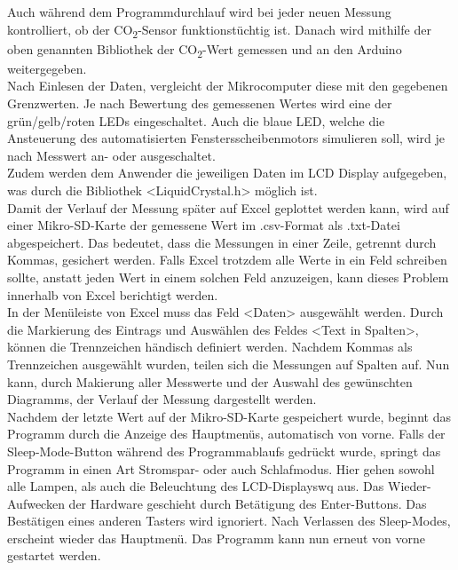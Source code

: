 Auch während dem Programmdurchlauf wird bei jeder neuen Messung kontrolliert, ob der CO\textsubscript{2}-Sensor funktionstüchtig ist. Danach wird mithilfe der oben genannten Bibliothek der CO\textsubscript{2}-Wert gemessen und an den Arduino weitergegeben. \\
Nach Einlesen der Daten, vergleicht der Mikrocomputer diese mit den gegebenen Grenzwerten. Je nach Bewertung des gemessenen Wertes wird eine der grün/gelb/roten \ac{LED}s eingeschaltet. Auch die blaue \ac{LED}, welche die Ansteuerung des automatisierten Fenstersscheibenmotors simulieren soll, wird je nach Messwert an- oder ausgeschaltet. \\
Zudem werden dem Anwender die jeweiligen Daten im \ac{LCD} Display aufgegeben, was durch die Bibliothek <LiquidCrystal.h> möglich ist. \\
Damit der Verlauf der Messung später auf Excel geplottet werden kann, wird auf einer Mikro-SD-Karte der gemessene Wert im .csv-Format als .txt-Datei abgespeichert. Das bedeutet, dass die Messungen in einer Zeile, getrennt durch Kommas, gesichert werden. Falls Excel trotzdem alle Werte in ein Feld schreiben sollte, anstatt jeden Wert in einem solchen Feld anzuzeigen, kann dieses Problem innerhalb von Excel berichtigt werden. \\
In der Menüleiste von Excel muss das Feld <Daten> ausgewählt werden. Durch die Markierung des Eintrags und Auswählen des Feldes <Text in Spalten>, können die Trennzeichen händisch definiert werden. Nachdem Kommas als Trennzeichen ausgewählt wurden, teilen sich die Messungen auf Spalten auf. Nun kann, durch Makierung aller Messwerte und der Auswahl des gewünschten Diagramms, der Verlauf der Messung dargestellt werden. \\
Nachdem der letzte Wert auf der Mikro-SD-Karte gespeichert wurde, beginnt das Programm durch die Anzeige des Hauptmenüs, automatisch von vorne. Falls der Sleep-Mode-Button während des Programmablaufs gedrückt wurde, springt das Programm in einen Art Stromspar- oder auch Schlafmodus. Hier gehen sowohl alle Lampen, als auch die Beleuchtung des \ac{LCD}-Displayswq aus. Das Wieder-Aufwecken der Hardware geschieht durch Betätigung des Enter-Buttons. Das Bestätigen eines anderen Tasters wird ignoriert. Nach Verlassen des Sleep-Modes, erscheint wieder das Hauptmenü. Das Programm kann nun erneut von vorne gestartet werden. \\